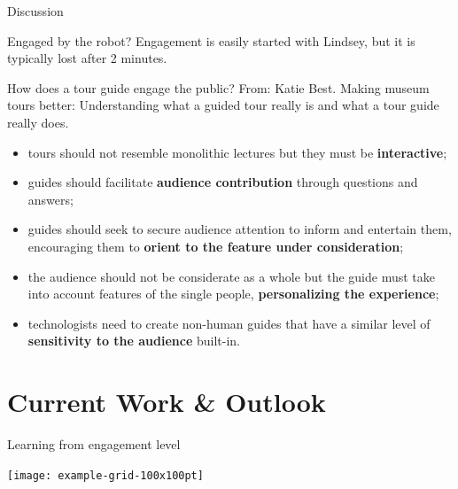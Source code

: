 \documentclass[english,svgnames,notes=hide,14pt]{beamer}
\begin{document}
\begin{frame}[shrink=25]{Discussion}

    \begin{alertblock}{Engaged by the robot?}
        Engagement is easily started with Lindsey, but it is typically lost after 2 minutes.
    \end{alertblock}
    
    \begin{block}{How does a tour guide engage the public?}
    {\tiny From: Katie Best. Making museum tours better: Understanding what a guided tour really is and what a tour guide really does.}
        \begin{itemize}
            \item tours should not resemble monolithic lectures but they must be \textbf{interactive};
            \item guides should facilitate \textbf{audience contribution} through questions and answers;
            \item guides should seek to secure audience attention to inform and entertain them, encouraging them to \textbf{orient to the feature under consideration};
            \item the audience should not be considerate as a whole but the guide must take into account features of the single people, \textbf{personalizing the experience};
            \item technologists need to create non-human guides that have a similar level of \textbf{sensitivity to the audience} built-in.
        \end{itemize}
        
    \end{block}
\end{frame}

\section{Current Work \& Outlook}

\begin{frame}{Learning from engagement level}
    \begin{block}{}
        \lipsum[66]
    \end{block}
    \begin{center}
        \texttt{[image: example-grid-100x100pt]}
    \end{center}
\end{frame}
\end{document}
